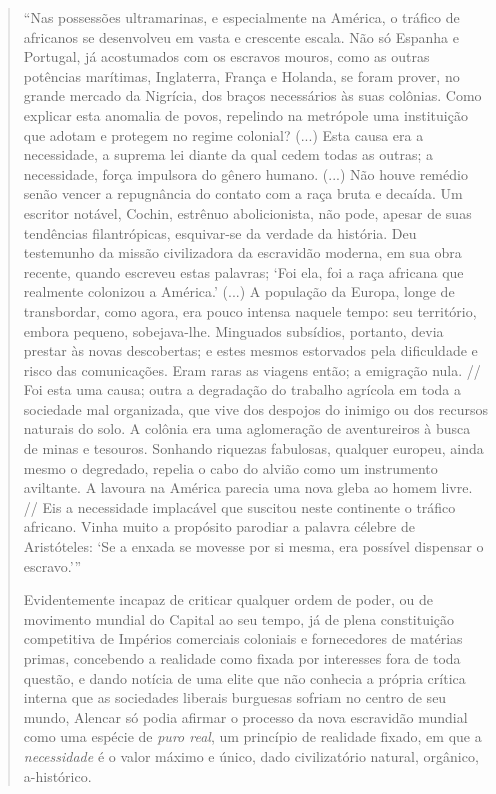 \begin{quote}
``Nas possessões ultramarinas, e especialmente na América, o tráfico de
africanos se desenvolveu em vasta e crescente escala. Não só Espanha e
Portugal, já acostumados com os escravos mouros, como as outras
potências marítimas, Inglaterra, França e Holanda, se foram prover, no
grande mercado da Nigrícia, dos braços necessários às suas colônias.
Como explicar esta anomalia de povos, repelindo na metrópole uma
instituição que adotam e protegem no regime colonial? (...) Esta causa
era a necessidade, a suprema lei diante da qual cedem todas as outras; a
necessidade, força impulsora do gênero humano. (...) Não houve remédio
senão vencer a repugnância do contato com a raça bruta e decaída. Um
escritor notável, Cochin, estrênuo abolicionista, não pode, apesar de
suas tendências filantrópicas, esquivar-se da verdade da história. Deu
testemunho da missão civilizadora da escravidão moderna, em sua obra
recente, quando escreveu estas palavras; `Foi ela, foi a raça africana
que realmente colonizou a América.' (...) A população da Europa, longe
de transbordar, como agora, era pouco intensa naquele tempo: seu
território, embora pequeno, sobejava-lhe. Minguados subsídios, portanto,
devia prestar às novas descobertas; e estes mesmos estorvados pela
dificuldade e risco das comunicações. Eram raras as viagens então; a
emigração nula. // Foi esta uma causa; outra a degradação do trabalho
agrícola em toda a sociedade mal organizada, que vive dos despojos do
inimigo ou dos recursos naturais do solo. A colônia era uma aglomeração
de aventureiros à busca de minas e tesouros. Sonhando riquezas
fabulosas, qualquer europeu, ainda mesmo o degredado, repelia o cabo do
alvião como um instrumento aviltante. A lavoura na América parecia uma
nova gleba ao homem livre. // Eis a necessidade implacável que suscitou
neste continente o tráfico africano. Vinha muito a propósito parodiar a
palavra célebre de Aristóteles: `Se a enxada se movesse por si mesma,
era possível dispensar o escravo.'''

Evidentemente incapaz de criticar qualquer ordem de poder, ou de
movimento mundial do Capital ao seu tempo, já de plena constituição
competitiva de Impérios comerciais coloniais e fornecedores de matérias
primas, concebendo a realidade como fixada por interesses fora de toda
questão, e dando notícia de uma elite que não conhecia a própria crítica
interna que as sociedades liberais burguesas sofriam no centro de seu
mundo, Alencar só podia afirmar o processo da nova escravidão mundial
como uma espécie de \emph{puro real}, um princípio de realidade fixado,
em que a \emph{necessidade} é o valor máximo e único, dado civilizatório
natural, orgânico, a-histórico.


\end{quote}
